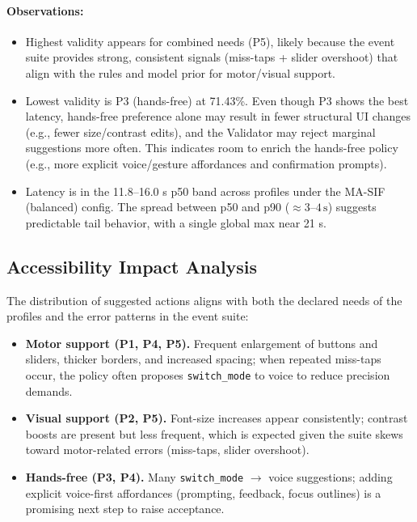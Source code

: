 \documentclass[openany]{book}
\begin{document}
\paragraph{Observations:}
\begin{itemize}
    \item Highest validity appears for combined needs (P5), likely because the event suite provides strong, consistent signals (miss-taps + slider overshoot) that align with the rules and model prior for motor/visual support.
    \item Lowest validity is P3 (hands-free) at 71.43\%. Even though P3 shows the best latency, hands-free preference alone may result in fewer structural UI changes (e.g., fewer size/contrast edits), and the Validator may reject marginal suggestions more often. This indicates room to enrich the hands-free policy (e.g., more explicit voice/gesture affordances and confirmation prompts).
    \item Latency is in the 11.8--16.0 s p50 band across profiles under the MA-SIF (balanced) config. The spread between p50 and p90 ($\approx 3$--$4\,\mathrm{s}$) suggests predictable tail behavior, with a single global max near 21 s.
\end{itemize}

\subsection{Accessibility Impact Analysis}
The distribution of suggested actions aligns with both the declared needs of the profiles and the error patterns in the event suite:

\begin{itemize}
  \item \textbf{Motor support (P1, P4, P5).} Frequent enlargement of buttons and sliders, thicker borders, and increased spacing; when repeated miss-taps occur, the policy often proposes \texttt{switch\_mode} to voice to reduce precision demands.
  \item \textbf{Visual support (P2, P5).} Font-size increases appear consistently; contrast boosts are present but less frequent, which is expected given the suite skews toward motor-related errors (miss-taps, slider overshoot).
  \item \textbf{Hands-free (P3, P4).} Many \texttt{switch\_mode} $\rightarrow$ voice suggestions; adding explicit voice-first affordances (prompting, feedback, focus outlines) is a promising next step to raise acceptance.
\end{itemize}
\end{document}
